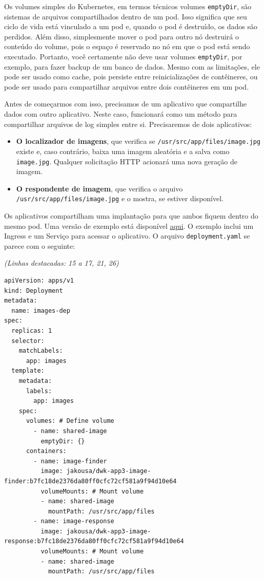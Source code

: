 \documentclass[11pt,a4paper]{article}
\begin{document}
Os volumes simples do Kubernetes, em termos técnicos volumes \texttt{emptyDir}, são sistemas de arquivos compartilhados dentro de um pod. Isso significa que seu ciclo de vida está vinculado a um pod e, quando o pod é destruído, os dados são perdidos. Além disso, simplesmente mover o pod para outro nó destruirá o conteúdo do volume, pois o espaço é reservado no nó em que o pod está sendo executado. Portanto, você certamente não deve usar volumes \texttt{emptyDir}, por exemplo, para fazer backup de um banco de dados. Mesmo com as limitações, ele pode ser usado como cache, pois persiste entre reinicializações de contêineres, ou pode ser usado para compartilhar arquivos entre dois contêineres em um pod.

Antes de começarmos com isso, precisamos de um aplicativo que compartilhe dados com outro aplicativo. Neste caso, funcionará como um método para compartilhar arquivos de log simples entre si. Precisaremos de dois aplicativos:

\begin{itemize}
    \item \textbf{O localizador de imagens}, que verifica se \texttt{/usr/src/app/files/image.jpg} existe e, caso contrário, baixa uma imagem aleatória e a salva como \texttt{image.jpg}. Qualquer solicitação HTTP acionará uma nova geração de imagem.
    \item \textbf{O respondente de imagem}, que verifica o arquivo \texttt{/usr/src/app/files/image.jpg} e o mostra, se estiver disponível.
\end{itemize}

Os aplicativos compartilham uma implantação para que ambos fiquem dentro do mesmo pod. Uma versão de exemplo está disponível \href{https://github.com/kubernetes-hy/material-example/tree/b9ff709b4af7ca13643635e07df7367b54f5c575/app3}{aqui}. O exemplo inclui um Ingress e um Serviço para acessar o aplicativo. O arquivo \texttt{deployment.yaml} se parece com o seguinte:

\textit{(Linhas destacadas: 15 a 17, 21, 26)}

\begin{verbatim}
apiVersion: apps/v1
kind: Deployment
metadata:
  name: images-dep
spec:
  replicas: 1
  selector:
    matchLabels:
      app: images
  template:
    metadata:
      labels:
        app: images
    spec:
      volumes: # Define volume
        - name: shared-image
          emptyDir: {}
      containers:
        - name: image-finder
          image: jakousa/dwk-app3-image-finder:b7fc18de2376da80ff0cfc72cf581a9f94d10e64
          volumeMounts: # Mount volume
          - name: shared-image
            mountPath: /usr/src/app/files
        - name: image-response
          image: jakousa/dwk-app3-image-response:b7fc18de2376da80ff0cfc72cf581a9f94d10e64
          volumeMounts: # Mount volume
          - name: shared-image
            mountPath: /usr/src/app/files
\end{verbatim}
\end{document}
